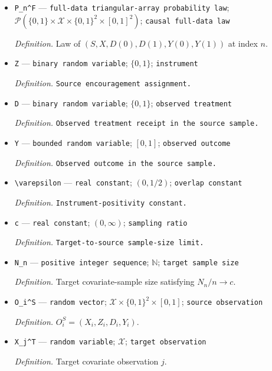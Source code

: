 \documentclass{article}
\begin{document}
\begin{itemize}
  \item \texttt{P\_\allowbreak{}n\textasciicircum{}F} --- \texttt{full-\allowbreak{}data triangular-\allowbreak{}array probability law}; \(\mathcal P(\{0,1\}\times\mathcal X\times\{0,1\}^2\times[0,1]^2)\); \texttt{causal full-\allowbreak{}data law}
  \par\smallskip\noindent\emph{Definition.} Law of \((S,X,D(0),D(1),Y(0),Y(1))\) at index \(n\).
  \item \texttt{Z} --- \texttt{binary random variable}; \(\{0,1\}\); \texttt{instrument}
  \par\smallskip\noindent\emph{Definition.} \texttt{Source encouragement assignment.}
  \item \texttt{D} --- \texttt{binary random variable}; \(\{0,1\}\); \texttt{observed treatment}
  \par\smallskip\noindent\emph{Definition.} \texttt{Observed treatment receipt in the source sample.}
  \item \texttt{Y} --- \texttt{bounded random variable}; \([0,1]\); \texttt{observed outcome}
  \par\smallskip\noindent\emph{Definition.} \texttt{Observed outcome in the source sample.}
  \item \texttt{\textbackslash{}\allowbreak{}varepsilon} --- \texttt{real constant}; \((0,1/2)\); \texttt{overlap constant}
  \par\smallskip\noindent\emph{Definition.} \texttt{Instrument-\allowbreak{}positivity constant.}
  \item \texttt{c} --- \texttt{real constant}; \((0,\infty)\); \texttt{sampling ratio}
  \par\smallskip\noindent\emph{Definition.} \texttt{Target-\allowbreak{}to-\allowbreak{}source sample-\allowbreak{}size limit.}
  \item \texttt{N\_\allowbreak{}n} --- \texttt{positive integer sequence}; \(\mathbb N\); \texttt{target sample size}
  \par\smallskip\noindent\emph{Definition.} Target covariate-sample size satisfying \(N_n/n\to c\).
  \item \texttt{O\_\allowbreak{}i\textasciicircum{}S} --- \texttt{random vector}; \(\mathcal X\times\{0,1\}^2\times[0,1]\); \texttt{source observation}
  \par\smallskip\noindent\emph{Definition.} \(O_i^S=(X_i,Z_i,D_i,Y_i)\).
  \item \texttt{X\_\allowbreak{}j\textasciicircum{}T} --- \texttt{random variable}; \(\mathcal X\); \texttt{target observation}
  \par\smallskip\noindent\emph{Definition.} Target covariate observation \(j\).

\end{itemize}
\end{document}
